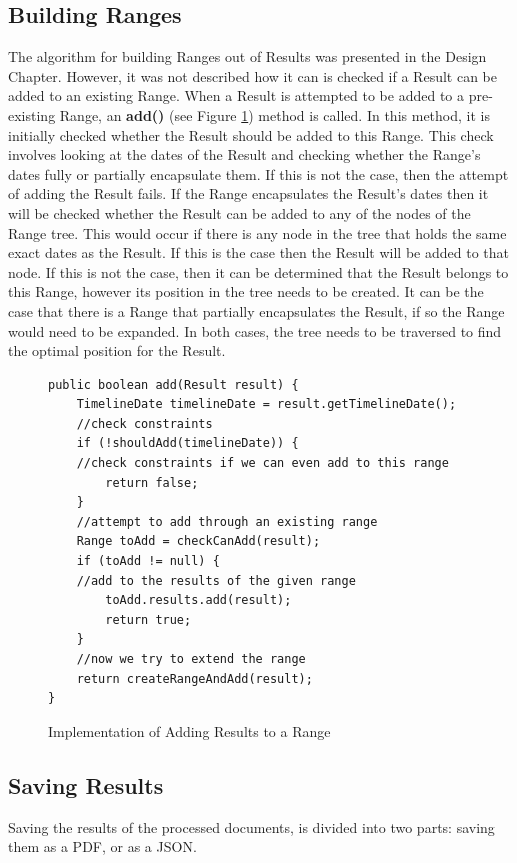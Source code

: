 \subsection{Building Ranges}
\par The algorithm for building Ranges out of Results was presented in the Design Chapter. However, it was not described how it can is checked if a Result can be added to an existing Range. When a Result is attempted to be added to a pre-existing Range, an \textbf{add()} (see Figure \ref{fig:addRangeImplementation}) method is called. In this method, it is initially checked whether the Result should be added to this Range. This check involves looking at the dates of the Result and checking whether the Range's dates fully or partially encapsulate them. If this is not the case, then the attempt of adding the Result fails. If the Range encapsulates the Result's dates then it will be checked whether the Result can be added to any of the nodes of the Range tree. This would occur if there is any node in the tree that holds the same exact dates as the Result. If this is the case then the Result will be added to that node. If this is not the case, then it can be determined that the Result belongs to this Range, however its position in the tree needs to be created. It can be the case that there is a Range that partially encapsulates the Result, if so the Range would need to be expanded. In both cases, the tree needs to be traversed to find the optimal position for the Result.

\begin{figure}[H]
\begin{lstlisting}
public boolean add(Result result) {
    TimelineDate timelineDate = result.getTimelineDate();
    //check constraints
    if (!shouldAdd(timelineDate)) {
	//check constraints if we can even add to this range
        return false;
    }
    //attempt to add through an existing range
    Range toAdd = checkCanAdd(result);
    if (toAdd != null) {
	//add to the results of the given range
        toAdd.results.add(result);
        return true;
    }
    //now we try to extend the range
    return createRangeAndAdd(result);
}
\end{lstlisting}
\caption{Implementation of Adding Results to a Range}
\label{fig:addRangeImplementation}
\end{figure}

\subsection{Saving Results}
\par Saving the results of the processed documents, is divided into two parts: saving them as a PDF, or as a JSON. 

